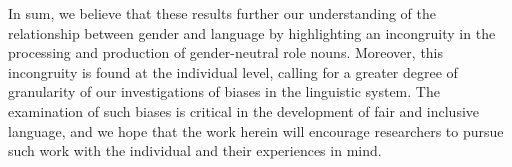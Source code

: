 \documentclass[10pt,letterpaper]{article}
\begin{document}
	In sum, we believe that these results further our understanding of the relationship between gender and language by highlighting an incongruity in the processing and production of gender-neutral role nouns. Moreover, this incongruity is found at the individual level, calling for a greater degree of granularity of our investigations of biases in the linguistic system. The examination of such biases is critical in the development of fair and inclusive language, and we hope that the work herein will encourage researchers to pursue such work with the individual and their experiences in mind. 
	

	\newpage
	\nocite{gal1995boundaries}
	\printbibliography
	
	
	
\end{document}
